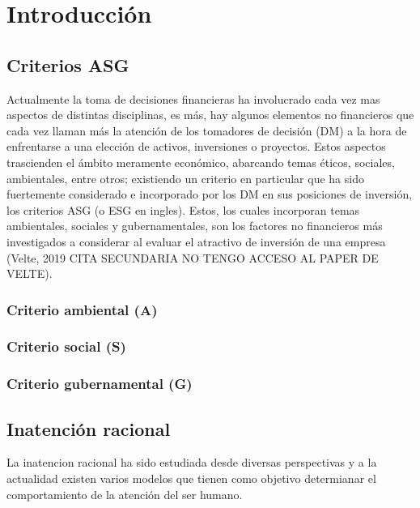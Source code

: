 \documentclass[11pt,letterpaper]{article}
\begin{document}

\tableofcontents
\newpage


\section{Introducción}

\subsection{Criterios ASG}

 Actualmente la toma de decisiones financieras ha involucrado cada vez mas aspectos de distintas disciplinas, es más, hay algunos elementos no financieros que cada vez llaman más la atención de los tomadores de decisión (DM) a la hora de enfrentarse a una elección de activos, inversiones o proyectos. Estos aspectos trascienden el ámbito meramente económico, abarcando temas éticos, sociales, ambientales, entre otros; existiendo un criterio en particular que ha sido fuertemente considerado e incorporado por los DM en sus posiciones de inversión, los criterios ASG (o ESG en ingles). Estos, los cuales incorporan temas ambientales, sociales y gubernamentales, son los factores no financieros más investigados a considerar al evaluar el atractivo de inversión de una empresa (Velte, 2019 CITA SECUNDARIA NO TENGO ACCESO AL PAPER DE VELTE).

 \subsubsection{Criterio ambiental (A)}

 \subsubsection{Criterio social (S)}

 \subsubsection{Criterio gubernamental (G)}

\subsection{Inatención racional}

La inatencion racional ha sido estudiada desde diversas perspectivas y a la actualidad existen varios modelos que tienen como objetivo determianar el comportamiento de la atención del ser humano.
\end{document}
